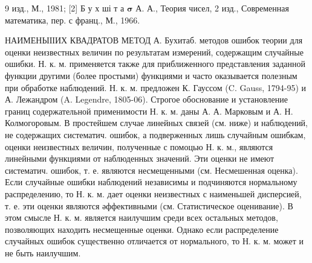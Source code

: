 \documentclass[10pt]{article}
\begin{document}
9 изд., М., 1981; [2] Б у х ші т а $\mathbf{\sigma}$ А. А., Теория чисел, 2 изд., Современная математика, пер. с франц., М., 1966.



НАИМЕНЫІІИХ КВАДРАТОВ МЕТОД А. Бухитаб. методов ошибок теории для оценки неизвестных величин по результатам измерений, содержащим случайные ошибки. Н. к. м. применяется также для приближенного представления заданной функции другими (более простыми) функциями и часто оказывается полезным при обработке наблюдений. Н. к. м. предложен К. Гауссом (C. Gauss, 1794-95) и А. Лежандром (A. Legendre, 1805-06). Строгое обоснование и установление границ содержательной применимости Н. к. м. даны А. А. Марковым и А. Н. Колмогоровым. В простейшем случае линейных связей (см. ниже) и наблюдений, не содержащих систематич. ошибок, а подверженных лишь случайным ошибкам, оценки неизвестных величин, полученные с помоцью Н. к. м., являются линейными функциями от наблюденных значений. Эти оценки не имеют систематич. ошибок, т. е. являются несмещенными (см. Несмешенная оценка). Если случайные ошибки наблюдений независимы и подчиняются нормальному распределению, то Н. к. м. дает оценки неизвестных с наименьшей дисперсией, т. е. эти оценки являются әффективными (см. Статистическое оценивание). В этом смысле Н. к. м. является наилучшим среди всех остальных методов, позволяющих находить несмещенные оценки. Однако если распределение случайных ошибок существенно отличается от нормального, то Н. к. м. может и не быть наилучшим.
\end{document}
